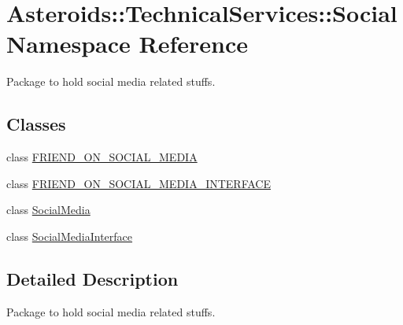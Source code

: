 \hypertarget{namespaceAsteroids_1_1TechnicalServices_1_1Social}{}\section{Asteroids\+:\+:Technical\+Services\+:\+:Social Namespace Reference}
\label{namespaceAsteroids_1_1TechnicalServices_1_1Social}


Package to hold social media related stuffs.  


\subsection*{Classes}
\begin{DoxyCompactItemize}
\item 
class \hyperlink{classAsteroids_1_1TechnicalServices_1_1Social_1_1FRIEND__ON__SOCIAL__MEDIA}{F\+R\+I\+E\+N\+D\+\_\+\+O\+N\+\_\+\+S\+O\+C\+I\+A\+L\+\_\+\+M\+E\+D\+IA}
\item 
class \hyperlink{classAsteroids_1_1TechnicalServices_1_1Social_1_1FRIEND__ON__SOCIAL__MEDIA__INTERFACE}{F\+R\+I\+E\+N\+D\+\_\+\+O\+N\+\_\+\+S\+O\+C\+I\+A\+L\+\_\+\+M\+E\+D\+I\+A\+\_\+\+I\+N\+T\+E\+R\+F\+A\+CE}
\item 
class \hyperlink{classAsteroids_1_1TechnicalServices_1_1Social_1_1SocialMedia}{Social\+Media}
\item 
class \hyperlink{classAsteroids_1_1TechnicalServices_1_1Social_1_1SocialMediaInterface}{Social\+Media\+Interface}
\end{DoxyCompactItemize}


\subsection{Detailed Description}
Package to hold social media related stuffs. 